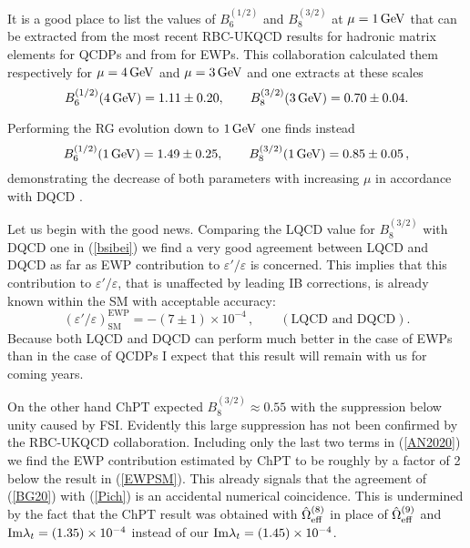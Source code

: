 \documentclass[12pt,a4paper]{article}
\newcommand{\gev}{\, {\rm GeV}}
\newcommand{\bsi}{B_6^{(1/2)}}
\newcommand{\bei}{B_8^{(3/2)}}
\def\epe{\varepsilon'/\varepsilon}
\newcommand{\be}{\begin{equation}}
\newcommand{\ee}{\end{equation}}
\newcommand{\im}{{\rm Im}}
\begin{document}
It is a good place to list the values of $\bsi$ and $\bei$ at $\mu=1\gev$
that can be extracted from the most recent RBC-UKQCD results for hadronic matrix elements  for QCDPs \cite{Abbott:2020hxn} and from \cite{Bai:2015nea} for EWPs. This collaboration
calculated them respectively for $\mu=4\gev$ and $\mu=3\gev$ and one
extracts at these scales \cite{Aebischer:2020jto}
\begin{equation}
  \label{eq:Lbsi}
  \bsi(4\gev)   = 1.11 \pm 0.20, \qquad \bei(3\gev) 
    = 0.70 \pm 0.04.
\end{equation}

Performing the RG evolution down to $1\gev$ one finds \cite{Aebischer:2020jto}
instead
\begin{equation}\label{LATB8}
   \bsi(1\gev)   = 1.49 \pm 0.25,  \qquad
  \bei(1\gev) 
    = 0.85 \pm 0.05\,,
\end{equation}
demonstrating the decrease of both parameters with increasing $\mu$ in accordance with DQCD \cite{Buras:2015xba}.


Let us begin  with the good news. Comparing the LQCD value for
$\bei$ with DQCD one in (\ref{bsibei}) we find 
a very good agreement between
LQCD and DQCD as far as EWP contribution to $\epe$ is concerned. This implies
that this contribution to $\epe$, that is unaffected by leading IB corrections, is already
known within the SM with acceptable accuracy:
\be
  \label{EWPSM}
  \boxed{(\epe)^{\text{EWP}}_\text{SM}   = - (7 \pm 1) \times 10^{-4} \,,\qquad (\text{LQCD~and~DQCD}).}
\ee
Because both LQCD and DQCD can perform much better in the case of EWPs than in the case of 
QCDPs I expect that this result will remain with us for coming years.

On the other hand ChPT expected $\bei\approx 0.55$ \cite{Cirigliano:2019ani} with the suppression below unity caused by FSI. Evidently this large suppression has not
been confirmed by the RBC-UKQCD collaboration. Including only the last two terms
in (\ref{AN2020}) we find the EWP contribution estimated by ChPT to be
roughly by a factor of 2 below the result in (\ref{EWPSM}). This already
signals that the agreement of (\ref{BG20}) with (\ref{Pich}) is an
accidental numerical coincidence. This is undermined by the fact that the ChPT
result was obtained with
$\hat\Omega^{(8)}_{\rm eff}$ in place of $\hat\Omega^{(9)}_{\rm eff}$ and 
$\im \lambda_t=(1.35)\times10^{-4}$ instead of our $\im \lambda_t=(1.45)\times10^{-4}$.
\end{document}
